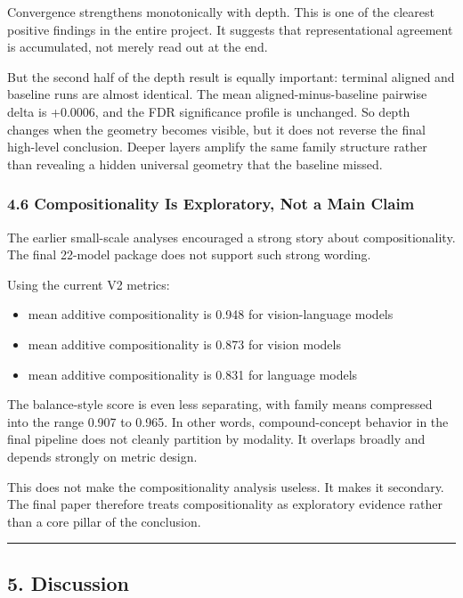 \documentclass[
]{article}
\providecommand{\tightlist}{%
  \setlength{\itemsep}{0pt}\setlength{\parskip}{0pt}}
\begin{document}
Convergence strengthens monotonically with depth. This is one of the
clearest positive findings in the entire project. It suggests that
representational agreement is accumulated, not merely read out at the
end.

But the second half of the depth result is equally important: terminal
aligned and baseline runs are almost identical. The mean
aligned-minus-baseline pairwise delta is +0.0006, and the FDR
significance profile is unchanged. So depth changes when the geometry
becomes visible, but it does not reverse the final high-level
conclusion. Deeper layers amplify the same family structure rather than
revealing a hidden universal geometry that the baseline missed.

\subsubsection{4.6 Compositionality Is Exploratory, Not a Main
Claim}\label{compositionality-is-exploratory-not-a-main-claim}

The earlier small-scale analyses encouraged a strong story about
compositionality. The final 22-model package does not support such
strong wording.

Using the current V2 metrics:

\begin{itemize}
\tightlist
\item
  mean additive compositionality is 0.948 for vision-language models
\item
  mean additive compositionality is 0.873 for vision models
\item
  mean additive compositionality is 0.831 for language models
\end{itemize}

The balance-style score is even less separating, with family means
compressed into the range 0.907 to 0.965. In other words,
compound-concept behavior in the final pipeline does not cleanly
partition by modality. It overlaps broadly and depends strongly on
metric design.

This does not make the compositionality analysis useless. It makes it
secondary. The final paper therefore treats compositionality as
exploratory evidence rather than a core pillar of the conclusion.

\begin{center}\rule{0.5\linewidth}{0.5pt}\end{center}

\subsection{5. Discussion}\label{discussion}
\end{document}
